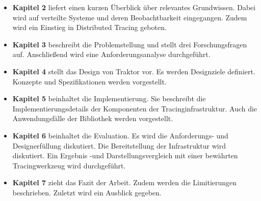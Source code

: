 \begin{itemize}
	\item \textbf{Kapitel 2} liefert einen kurzen Überblick über relevantes Grundwissen. Dabei wird auf verteilte Systeme und deren Beobachtbarkeit eingegangen. Zudem wird ein Einstieg in Distributed Tracing geboten.
	\item \textbf{Kapitel 3} beschreibt die Problemstellung und stellt drei Forschungsfragen auf. Anschließend wird eine Anforderungsanalyse durchgeführt.
	\item \textbf{Kapitel 4} stellt das Design von Traktor vor. Es werden Designziele definiert. Konzepte und Spezifikationen werden vorgestellt. 
	\item \textbf{Kapitel 5} beinhaltet die Implementierung. Sie beschreibt die Implementierungsdetails der Komponenten der Tracinginfrastruktur. Auch die Anwendungsfälle der Bibliothek werden vorgestellt.
	\item \textbf{Kapitel 6} beinhaltet die Evaluation. Es wird die Anforderungs- und Designerfüllung diskutiert. Die Bereitstellung der Infrastruktur wird diskutiert. Ein Ergebnis -und Darstellungsvergleich mit einer bewährten Tracingwerkzeug wird durchgeführt.
	\item \textbf{Kapitel 7} zieht das Fazit der Arbeit. Zudem werden die Limitierungen beschrieben. Zuletzt wird ein  Ausblick gegeben.
\end{itemize}
